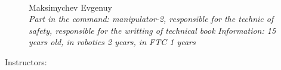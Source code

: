 \begin{figure}[H]
	\hfill
	\begin{minipage}[h]{0.47\linewidth}
		\\
		Maksimychev Evgenuy\\
		\emph{Part in the command: manipulator-2, responsible for the technic of safety, responsible for the writting of technical book}
		\emph{Information: 15 years old, in robotics 2 years, in FTC 1 years}
	\end{minipage}
\end{figure}

\newpage

\large  Instructors:

